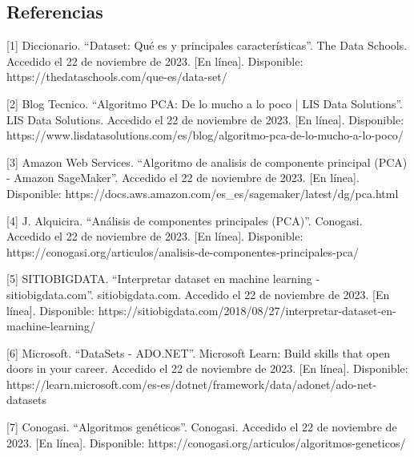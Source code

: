 \documentclass[12pt]{article}
\begin{document}
\clearpage




\subsection*{Referencias}


[1] Diccionario. “Dataset: Qué es y principales características”. The Data Schools. Accedido el 22 de noviembre de 2023. [En línea]. Disponible: https://thedataschools.com/que-es/data-set/\vspace{1cm}

[2] Blog Tecnico. “Algoritmo PCA: De lo mucho a lo poco | LIS Data Solutions”. LIS Data Solutions. Accedido el 22 de noviembre de 2023. [En línea]. Disponible: https://www.lisdatasolutions.com/es/blog/algoritmo-pca-de-lo-mucho-a-lo-poco/\vspace{1cm}

[3] Amazon Web Services. “Algoritmo de analisis de componente principal (PCA) - Amazon SageMaker”. Accedido el 22 de noviembre de 2023. [En línea]. Disponible: https://docs.aws.amazon.com/es\_es/sagemaker/latest/dg/pca.html\vspace{1cm}

[4] J. Alquicira. “Análisis de componentes principales (PCA)”. Conogasi. Accedido el 22 de noviembre de 2023. [En línea]. Disponible: https://conogasi.org/articulos/analisis-de-componentes-principales-pca/\vspace{1cm}

[5] SITIOBIGDATA. “Interpretar dataset en machine learning - sitiobigdata.com”. sitiobigdata.com. Accedido el 22 de noviembre de 2023. [En línea]. Disponible: https://sitiobigdata.com/2018/08/27/interpretar-dataset-en-machine-learning/\vspace{1cm}

[6] Microsoft. “DataSets - ADO.NET”. Microsoft Learn: Build skills that open doors in your career. Accedido el 22 de noviembre de 2023. [En línea]. Disponible: https://learn.microsoft.com/es-es/dotnet/framework/data/adonet/ado-net-datasets\vspace{1cm}

[7] Conogasi. “Algoritmos genéticos”. Conogasi. Accedido el 22 de noviembre de 2023. [En línea]. Disponible: https://conogasi.org/articulos/algoritmos-geneticos/\vspace{1cm}


\clearpage

\vspace{1cm}\vspace{1cm}
\end{document}
